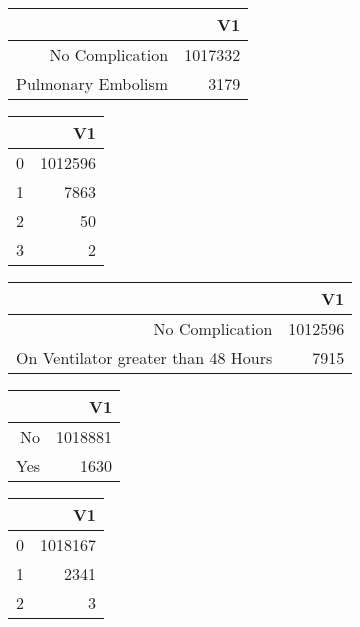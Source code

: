 \bigskip\bigskip
\centering
\begin{tabular}{rr}
  \hline
 & V1 \\ 
  \hline
No Complication & 1017332 \\ 
  Pulmonary Embolism & 3179 \\ 
   \hline
\end{tabular}

\bigskip\bigskip
\centering
\begin{tabular}{rr}
  \hline
 & V1 \\ 
  \hline
0 & 1012596 \\ 
  1 & 7863 \\ 
  2 &  50 \\ 
  3 &   2 \\ 
   \hline
\end{tabular}

\bigskip\bigskip
\centering
\begin{tabular}{rr}
  \hline
 & V1 \\ 
  \hline
No Complication & 1012596 \\ 
  On Ventilator greater than 48 Hours & 7915 \\ 
   \hline
\end{tabular}

\bigskip\bigskip
\centering
\begin{tabular}{rr}
  \hline
 & V1 \\ 
  \hline
No & 1018881 \\ 
  Yes & 1630 \\ 
   \hline
\end{tabular}

\bigskip\bigskip
\centering
\begin{tabular}{rr}
  \hline
 & V1 \\ 
  \hline
0 & 1018167 \\ 
  1 & 2341 \\ 
  2 &   3 \\ 
   \hline
\end{tabular}

